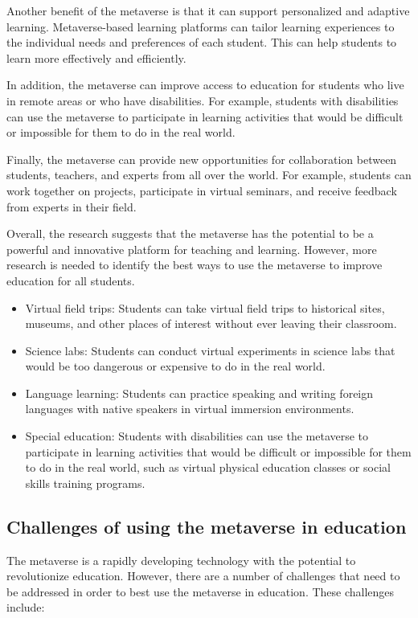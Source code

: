 \documentclass[12pt]{extarticle}
\begin{document}
Another benefit of the metaverse is that it can support personalized and adaptive learning. Metaverse-based learning platforms can tailor learning experiences to the individual needs and preferences of each student. This can help students to learn more effectively and efficiently.

In addition, the metaverse can improve access to education for students who live in remote areas or who have disabilities. For example, students with disabilities can use the metaverse to participate in learning activities that would be difficult or impossible for them to do in the real world.

Finally, the metaverse can provide new opportunities for collaboration between students, teachers, and experts from all over the world. For example, students can work together on projects, participate in virtual seminars, and receive feedback from experts in their field.

Overall, the research suggests that the metaverse has the potential to be a powerful and innovative platform for teaching and learning. However, more research is needed to identify the best ways to use the metaverse to improve education for all students.

\begin{itemize}
    \item Virtual field trips: Students can take virtual field trips to historical sites, museums, and other places of interest without ever leaving their classroom.
    \item Science labs: Students can conduct virtual experiments in science labs that would be too dangerous or expensive to do in the real world.
    \item Language learning: Students can practice speaking and writing foreign languages with native speakers in virtual immersion environments.
    \item Special education: Students with disabilities can use the metaverse to participate in learning activities that would be difficult or impossible for them to do in the real world, such as virtual physical education classes or social skills training programs.
\end{itemize}

\subsection{Challenges of using the metaverse in education}

The metaverse is a rapidly developing technology with the potential to revolutionize education. However, there are a number of challenges that need to be addressed in order to best use the metaverse in education. These challenges include:
\end{document}
